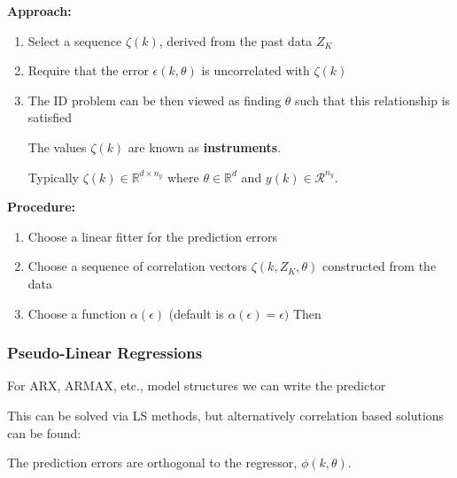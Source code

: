 \documentclass[10pt,a4paper]{scrartcl}
\begin{document}
\begin{multicols*}{2}
\textbf{Approach:}
\begin{enumerate}
\item Select a sequence $\zeta(k)$, derived from the past data $Z_K$
\item Require that the error $\epsilon(k,\theta)$ is uncorrelated with $\zeta(k)$
\item The ID problem can be then viewed as finding $\theta$ such that this relationship is satisfied

The values $\zeta(k)$ are known as \textbf{instruments}.

Typically $\zeta(k)\in\mathbb{R}^{d\times n_y}$ where $\theta\in\mathbb{R}^d$ and $y(k)\in\mathcal{R}^{n_y}$.
\end{enumerate}

\textbf{Procedure:}
\begin{enumerate}
\item Choose a linear fitter for the prediction errors


\item Choose a sequence of correlation vectors $\zeta(k,Z_K,\theta)$ constructed from the data
\item Choose a function $\alpha(\epsilon)$ (default is $\alpha(\epsilon)=\epsilon)$ Then

\end{enumerate}

\subsubsection{Pseudo-Linear Regressions}

For ARX, ARMAX, etc., model structures we can write the predictor


This can be solved via LS methods, but alternatively correlation based solutions can be found:


The prediction errors are orthogonal to the regressor, $\phi(k,\theta)$.


\end{multicols*}
\end{document}
